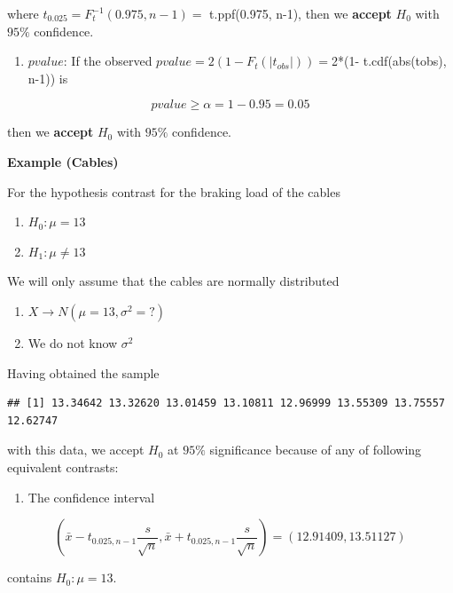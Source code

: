 \documentclass[
]{book}
\providecommand{\tightlist}{%
  \setlength{\itemsep}{0pt}\setlength{\parskip}{0pt}}
\begin{document}
where \(t_{0.025}=F_t^{-1}(0.975, n-1)=\) t.ppf(0.975, n-1), then we \textbf{accept} \(H_0\) with \(95\%\) confidence.

\begin{enumerate}
\def\labelenumi{\arabic{enumi}.}
\setcounter{enumi}{2}
\tightlist
\item
  \(pvalue\): If the observed \(pvalue= 2 (1-F_t(|t_{obs}|))=\)2*(1- t.cdf(abs(tobs), n-1)) is
\end{enumerate}

\[pvalue \geq \alpha =1-0.95=0.05\]

then we \textbf{accept} \(H_0\) with \(95\%\) confidence.

\textbf{Example (Cables)}

For the hypothesis contrast for the braking load of the cables

\begin{enumerate}
\def\labelenumi{\alph{enumi}.}
\tightlist
\item
  \(H_0:\mu = 13\)
\item
  \(H_1:\mu \neq 13\)
\end{enumerate}

We will only assume that the cables are normally distributed

\begin{enumerate}
\def\labelenumi{\arabic{enumi}.}
\tightlist
\item
  \(X \rightarrow N(\mu=13, \sigma^2=?)\)
\item
  We do not know \(\sigma^2\)
\end{enumerate}

Having obtained the sample

\begin{verbatim}
## [1] 13.34642 13.32620 13.01459 13.10811 12.96999 13.55309 13.75557 12.62747
\end{verbatim}

with this data, we accept \(H_0\) at \(95\%\) significance because of any of following equivalent contrasts:

\begin{enumerate}
\def\labelenumi{\arabic{enumi}.}
\tightlist
\item
  The confidence interval
\end{enumerate}

\[(\bar{x}-t_{0.025, n-1} \frac{s}{\sqrt{n}}, \bar{x}+t_{0.025, n-1} \frac{s}{\sqrt{n}})=(12.91409, 13.51127)\]

contains \(H_0:\mu=13\).
\end{document}
